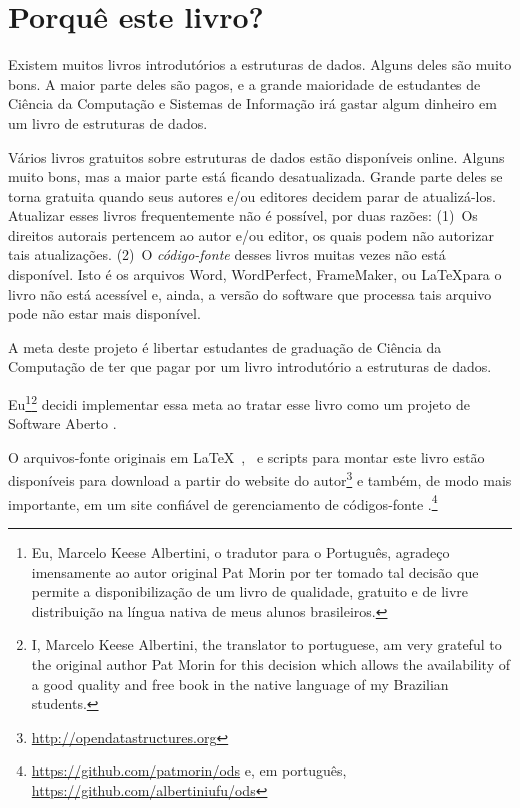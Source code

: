 \chapter*{Porquê este livro?}

Existem muitos livros introdutórios a estruturas de dados.
Alguns deles são muito bons. A maior parte deles são pagos, e a 
grande maioridade de estudantes de Ciência da Computação e Sistemas de 
Informação irá gastar algum dinheiro em um livro de estruturas de dados.

Vários livros gratuitos sobre estruturas de dados estão disponíveis online.
Alguns muito bons, mas a maior parte está ficando desatualizada. Grande
parte deles se torna gratuita quando seus autores e/ou editores decidem
parar de atualizá-los. Atualizar esses livros frequentemente não é possível,
por duas razões: (1)~Os direitos autorais pertencem ao autor e/ou editor,
os quais podem não autorizar tais atualizações. (2)~O \emph{código-fonte} desses
livros muitas vezes não está disponível. Isto é os arquivos Word, WordPerfect, 
FrameMaker, ou \LaTeX para o livro não está acessível e, ainda, a versão do
software que processa tais arquivo pode não estar mais disponível.

A meta deste projeto é libertar estudantes de graduação de Ciência da Computação
de ter que pagar por um livro introdutório a estruturas de dados.

Eu\footnote{Eu, Marcelo Keese Albertini, o tradutor para o Português, agradeço imensamente ao autor original Pat Morin por ter tomado tal decisão que permite a disponibilização de um livro de qualidade, gratuito e de livre distribuição na língua nativa de meus alunos brasileiros.}\footnote{I, Marcelo Keese Albertini, the translator to portuguese, am very grateful to the original author Pat Morin for this decision which allows the availability of a good quality and free book in the
native language of my Brazilian students.} decidi implementar essa meta ao tratar esse livro como um projeto de Software Aberto
%
%
.

O arquivos-fonte originais em \LaTeX\ , \lang\ e scripts para montar este livro estão disponíveis para download a partir do website do autor\footnote{\url{http://opendatastructures.org}}
e também, de modo mais importante, em um site confiável de gerenciamento de códigos-fonte
.\footnote{\url{https://github.com/patmorin/ods} e, em português, \url{https://github.com/albertiniufu/ods}}


